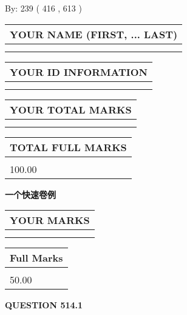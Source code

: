 \documentclass{ctexart}
\begin{document}
   
\hspace{1.0in} By: 
 239 ( 416 ,  613 )
   
   
   
   
\newpage 
\setcounter{page}{ 
   514001 } 
   
   
   
   
\noindent\begin{tabular}{|l|}
\hline
YOUR NAME (FIRST, ... LAST)  \\
\hline
 \\ 
 \\ 
\hline
\end{tabular}
\hspace{0.05in} \begin{tabular}{|l|}
\hline
 YOUR   ID   INFORMATION  \\
\hline
 \\ 
 \\ 
\hline
\end{tabular}
   
   
\vspace{0.2in}\noindent\begin{tabular}{|l|}
\hline
YOUR TOTAL MARKS  \\
\hline
 \\ 
 \\ 
\hline
\end{tabular}
\hspace{0.05in} \begin{tabular}{|l|}
\hline
TOTAL FULL MARKS  \\
\hline
 \\ 
100.00 \\
\hline
\end{tabular}
   
   
 \vspace{0.2in}
{\LARGE {\textbf{ 一个快速卷例}}}
   
   
  
\vspace{0.2in}
  
\noindent\begin{tabular}{|l|}
\hline
 YOUR MARKS  \\
\hline
 \\ 
 \\ 
\hline
\end{tabular}
\hspace{0.05in} \begin{tabular}{|l|}
\hline
 Full Marks  \\
\hline
 \\ 
50.00 \\
\hline
\end{tabular}
{\textbf{\Large{QUESTION
514.1 
}}}
  
\end{document}
